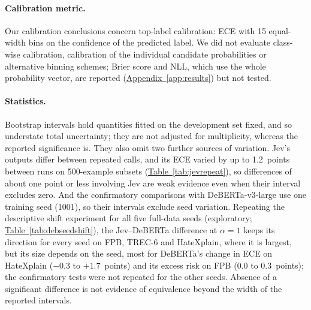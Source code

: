 \paragraph{Calibration metric.}
Our calibration conclusions concern top-label calibration: ECE with 15 equal-width bins on the confidence of the
predicted label. We did not evaluate class-wise calibration, calibration of the individual candidate probabilities or
alternative binning schemes; Brier score and NLL, which use the whole probability vector, are reported
(\hyperref[app:results]{Appendix~\ref*{app:results}}) but not tested.

\paragraph{Statistics.}
Bootstrap intervals hold quantities fitted on the development set fixed, and so understate total uncertainty; they are
not adjusted for multiplicity, whereas the reported significance is. They also omit two further sources of variation.
Jev's outputs differ between repeated calls, and its ECE varied by up to 1.2~points between runs on 500-example subsets
(\hyperref[tab:jevrepeat]{Table~\ref*{tab:jevrepeat}}), so differences of about one point or less involving Jev are weak
evidence even when their interval excludes zero. And the confirmatory comparisons with DeBERTa-v3-large use one training
seed (1001), so their intervals exclude seed variation. Repeating the descriptive shift experiment for all five
full-data seeds (exploratory; \hyperref[tab:debseedshift]{Table~\ref*{tab:debseedshift}}), the Jev--DeBERTa difference
at $\alpha=1$ keeps its direction for every seed on FPB, TREC-6 and HateXplain, where it is largest, but its size
depends on the seed, most for DeBERTa's change in ECE on HateXplain ($-0.3$ to $+1.7$~points) and its excess risk on FPB
(0.0 to 0.3~points); the confirmatory tests were not repeated for the other seeds. Absence of a significant difference is not evidence of equivalence beyond the width of the
reported intervals.
